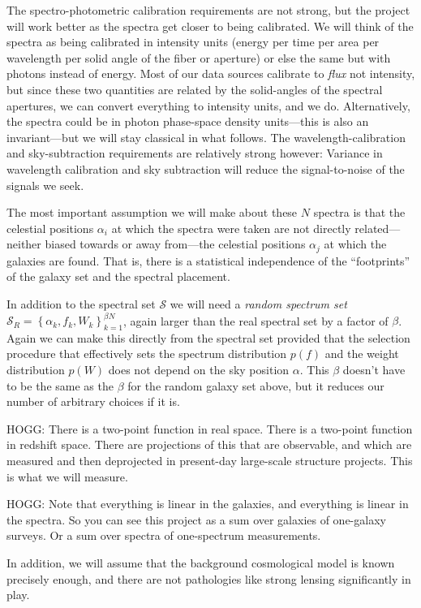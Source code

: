 \documentclass{article}
\newcommand{\setof}[1]{\left\{{#1}\right\}}
\newcommand{\set}[1]{\mathscr{#1}}
\begin{document}
The spectro-photometric calibration requirements are not strong, but the project will work better as the spectra get closer to being calibrated.
We will think of the spectra as being calibrated in intensity units (energy per time per area per wavelength per solid angle of the fiber or aperture) or else the same but with photons instead of energy.
Most of our data sources calibrate to \emph{flux} not intensity, but since these two quantities are related by the solid-angles of the spectral apertures, we can convert everything to intensity units, and we do.
Alternatively, the spectra could be in photon phase-space density units---this is also an invariant---but we will stay classical in what follows.
The wavelength-calibration and sky-subtraction requirements are relatively strong however:
Variance in wavelength calibration and sky subtraction will reduce the signal-to-noise of the signals we seek.

The most important assumption we will make about these $N$ spectra is that the celestial positions $\alpha_i$ at which the spectra were taken are not directly related---neither biased towards or away from---the celestial positions $\alpha_j$ at which the galaxies are found.
That is, there is a statistical independence of the ``footprints'' of the galaxy set and the spectral placement.

In addition to the spectral set $\set{S}$ we will need a \emph{random spectrum set} $\set{S}_R=\setof{\alpha_k,f_k,W_k}_{k=1}^{\beta N}$, again larger than the real spectral set by a factor of $\beta$.
Again we can make this directly from the spectral set provided that the selection procedure that effectively sets the spectrum distribution $p(f)$ and the weight distribution $p(W)$ does not depend on the sky position $\alpha$.
This $\beta$ doesn't have to be the same as the $\beta$ for the random galaxy set above, but it reduces our number of arbitrary choices if it is.

HOGG: There is a two-point function in real space. There is a two-point function in redshift space. There are projections of this that are observable, and which are measured and then deprojected in present-day large-scale structure projects. This is what we will measure.

HOGG: Note that everything is linear in the galaxies, and everything is linear in the spectra. So you can see this project as a sum over galaxies of one-galaxy surveys. Or a sum over spectra of one-spectrum measurements.

In addition, we will assume that the background cosmological model is known precisely enough, and there are not pathologies like strong lensing significantly in play.
\end{document}
